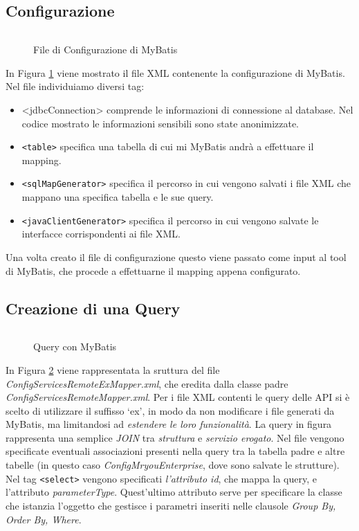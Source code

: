 \subsection{Configurazione}
\begin{figure}[H]
    \inputminted[firstline=6, lastline=35]{octave}{src/MyBatis/MyBatisGenerator.xml}
    \caption{File di Configurazione di MyBatis}
    \label{fig:mybatisconfiguration}
\end{figure}

In Figura \ref{fig:mybatisconfiguration} viene mostrato il file XML contenente la configurazione di MyBatis. Nel file individuiamo diversi tag:
\begin{itemize}
    \item <jdbcConnection> comprende le informazioni di connessione al database. Nel codice mostrato le informazioni sensibili sono state anonimizzate.
    \item \texttt{<table>} specifica una tabella di cui mi MyBatis andrà a effettuare il mapping.
    \item \texttt{<sqlMapGenerator>} specifica il percorso in cui vengono salvati i file XML che mappano una specifica tabella e le sue query.
    \item \texttt{<javaClientGenerator>} specifica il percorso in cui vengono salvate le interfacce corrispondenti ai file XML.
\end{itemize}

Una volta creato il file di configurazione questo viene passato come input al tool di MyBatis, che procede a effettuarne il mapping appena configurato.

\subsection{Creazione di una Query}
\begin{figure}[H]
    \inputminted[firstline=3, lastline=30]{octave}{src/MyBatis/ServicesExMapper.xml}
    \caption{Query con MyBatis}
    \label{fig:mybatisquery}
\end{figure}
In Figura \ref{fig:mybatisquery} viene rappresentata la sruttura del file \emph{ConfigServicesRemoteExMapper.xml}, che eredita dalla classe padre \emph{ConfigServicesRemoteMapper.xml}. Per i file XML contenti le query delle API si è scelto di utilizzare il suffisso `ex', in modo da non modificare i file generati da MyBatis, ma limitandosi ad \emph{estendere le loro funzionalità}. La query in figura rappresenta una semplice \emph{JOIN} tra \emph{struttura} e \emph{servizio erogato}. Nel file vengono specificate eventuali associazioni presenti nella query tra la tabella padre e altre tabelle (in questo caso \textit{ConfigMryouEnterprise}, dove sono salvate le strutture). Nel tag \texttt{<select>} vengono specificati \emph{l'attributo id}, che mappa la query, e l'attributo \emph{parameterType}. Quest'ultimo attributo serve per specificare la classe che istanzia l'oggetto che gestisce i parametri inseriti nelle clausole \textit{Group By, Order By, Where}.


